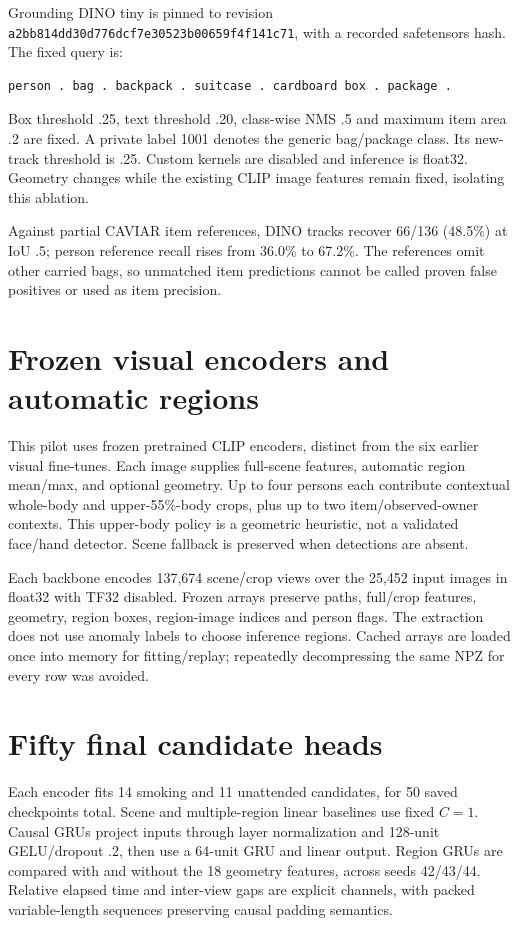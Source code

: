 Grounding DINO tiny is pinned to revision \texttt{a2bb814dd30d776dcf7e30523b00659f4f141c71}, with a recorded safetensors hash. The fixed query is:
\begin{lstlisting}
person . bag . backpack . suitcase . cardboard box . package .
\end{lstlisting}
Box threshold .25, text threshold .20, class-wise NMS .5 and maximum item area .2 are fixed. A private label 1001 denotes the generic bag/package class. Its new-track threshold is .25. Custom kernels are disabled and inference is float32. Geometry changes while the existing CLIP image features remain fixed, isolating this ablation.

Against partial CAVIAR item references, DINO tracks recover 66/136 (48.5\%) at IoU .5; person reference recall rises from 36.0\% to 67.2\%. The references omit other carried bags, so unmatched item predictions cannot be called proven false positives or used as item precision.

\section{Frozen visual encoders and automatic regions}
This pilot uses frozen pretrained CLIP encoders, distinct from the six earlier visual fine-tunes. Each image supplies full-scene features, automatic region mean/max, and optional geometry. Up to four persons each contribute contextual whole-body and upper-55\%-body crops, plus up to two item/observed-owner contexts. This upper-body policy is a geometric heuristic, not a validated face/hand detector. Scene fallback is preserved when detections are absent.

Each backbone encodes 137,674 scene/crop views over the 25,452 input images in float32 with TF32 disabled. Frozen arrays preserve paths, full/crop features, geometry, region boxes, region-image indices and person flags. The extraction does not use anomaly labels to choose inference regions. Cached arrays are loaded once into memory for fitting/replay; repeatedly decompressing the same NPZ for every row was avoided.

\section{Fifty final candidate heads}
Each encoder fits 14 smoking and 11 unattended candidates, for 50 saved checkpoints total. Scene and multiple-region linear baselines use fixed $C=1$. Causal GRUs project inputs through layer normalization and 128-unit GELU/dropout .2, then use a 64-unit GRU and linear output. Region GRUs are compared with and without the 18 geometry features, across seeds 42/43/44. Relative elapsed time and inter-view gaps are explicit channels, with packed variable-length sequences preserving causal padding semantics.

